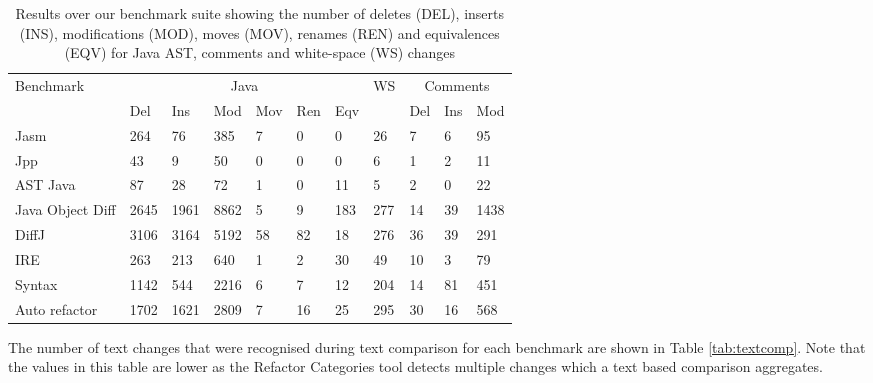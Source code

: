 \begin{table}[t!]
    \small
    \begin{tabular}{l|llllll|l|lll}
    Benchmark        & \multicolumn{6}{|c|}{Java}           & WS & \multicolumn{3}{|c}{Comments} \\ \cline{2-7} \cline{9-11}
    ~                & Del  & Ins  & Mod  & Mov & Ren & Eqv & ~          & Del      & Ins & Mod  \\ \hline
    Jasm             & 264  & 76   & 385  & 7   & 0   & 0   & 26         & 7        & 6   & 95   \\
    Jpp              & 43   & 9    & 50   & 0   & 0   & 0   & 6          & 1        & 2   & 11   \\
    AST Java         & 87   & 28   & 72   & 1   & 0   & 11  & 5          & 2        & 0   & 22   \\
    \begin{minipage}[t]{0.15\textwidth}Java Object Diff\end{minipage} & 2645 & 1961 & 8862 & 5   & 9   & 183 & 277        & 14       & 39  & 1438 \\
    DiffJ            & 3106 & 3164 & 5192 & 58  & 82  & 18  & 276        & 36       & 39  & 291  \\
    IRE              & 263  & 213  & 640  & 1   & 2   & 30  & 49         & 10       & 3   & 79   \\
    Syntax           & 1142 & 544  & 2216 & 6   & 7   & 12  & 204        & 14       & 81  & 451  \\
    Auto refactor    & 1702 & 1621 & 2809 & 7   & 16  & 25  & 295        & 30       & 16  & 568  \\
    \end{tabular}
    \caption{Results over our benchmark suite showing the number of deletes (DEL), inserts (INS), modifications (MOD), moves (MOV), renames (REN) and equivalences (EQV) for Java AST, comments and white-space (WS) changes}
    \label{tab:results}
\end{table}

The number of text changes that were recognised during text comparison for each benchmark are shown in Table \ref{tab:textcomp}. Note that the values in this table are lower as the Refactor Categories tool detects multiple changes which a text based comparison aggregates.  

